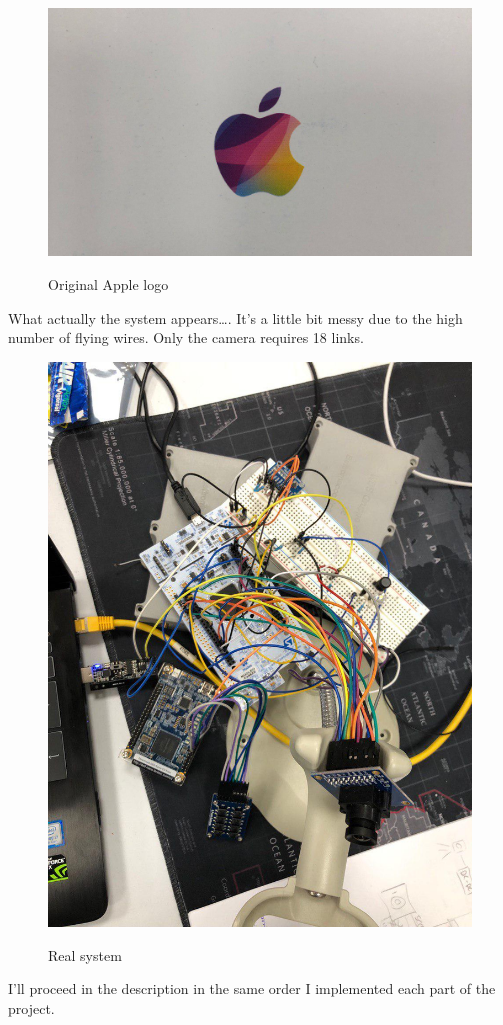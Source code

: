 \begin{figure}[H]
\centering
\includegraphics[scale=.1]{Immagini/05}
\label{05}
\caption{Original Apple logo}
\end{figure}
What actually the system appears\dots. It's a little bit messy due to the high number of flying wires. Only the camera requires 18 links.

\begin{figure}[H]
\centering
\includegraphics[scale=.4]{Immagini/02}
\label{02}
\caption{Real system}
\end{figure}

I'll proceed in the description in the same order I implemented each part of the project.